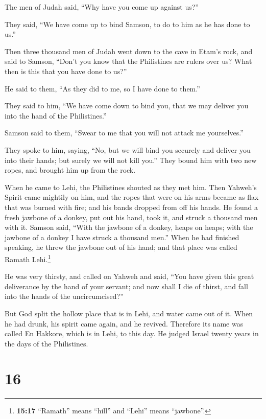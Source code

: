  The men of Judah said, ``Why have you come up against
us?''

They said, ``We have come up to bind Samson, to do to him as he has done
to us.''

 Then three thousand men of Judah went down to the cave
in Etam's rock, and said to Samson, ``Don't you know that the
Philistines are rulers over us? What then is this that you have done to
us?''

He said to them, ``As they did to me, so I have done to them.''

 They said to him, ``We have come down to bind you, that
we may deliver you into the hand of the Philistines.''

Samson said to them, ``Swear to me that you will not attack me
yourselves.''

 They spoke to him, saying, ``No, but we will bind you
securely and deliver you into their hands; but surely we will not kill
you.'' They bound him with two new ropes, and brought him up from the
rock.

 When he came to Lehi, the Philistines shouted as they
met him. Then Yahweh's Spirit came mightily on him, and the ropes that
were on his arms became as flax that was burned with fire; and his bands
dropped from off his hands.  He found a fresh jawbone of
a donkey, put out his hand, took it, and struck a thousand men with it.
 Samson said, ``With the jawbone of a donkey, heaps on
heaps; with the jawbone of a donkey I have struck a thousand men.''
 When he had finished speaking, he threw the jawbone out
of his hand; and that place was called Ramath Lehi.\footnote{\textbf{15:17}
  ``Ramath'' means ``hill'' and ``Lehi'' means ``jawbone''.}

 He was very thirsty, and called on Yahweh and said,
``You have given this great deliverance by the hand of your servant; and
now shall I die of thirst, and fall into the hands of the
uncircumcised?''

 But God split the hollow place that is in Lehi, and
water came out of it. When he had drunk, his spirit came again, and he
revived. Therefore its name was called En Hakkore, which is in Lehi, to
this day.  He judged Israel twenty years in the days of
the Philistines.

\hypertarget{section-15}{%
\section{16}\label{section-15}}

